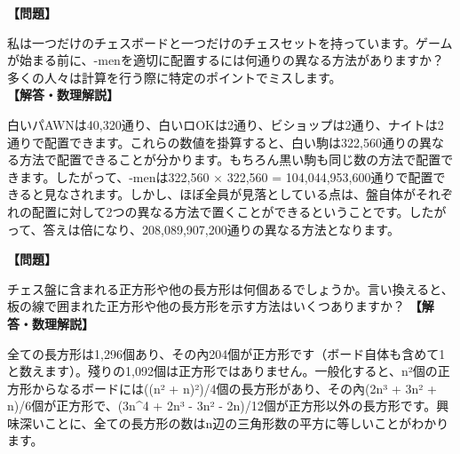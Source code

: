 \documentclass[10pt,a4paper,oneside,openany]{ltjsbook}
\begin{document}
\begin{tcolorbox}[colback=softblue,colframe=primaryblue,title=\textbf{第 346 問：盤を整える方法 （原題: SETTING THE BOARD.）},arc=2mm,boxrule=1pt,breakable]
\textbf{【問題】}\par\vspace{0.3em}
私は一つだけのチェスボードと一つだけのチェスセットを持っています。ゲームが始まる前に、-menを適切に配置するには何通りの異なる方法がありますか？多くの人々は計算を行う際に特定のポイントでミスします。
\tcblower
\textbf{【解答・数理解説】}\par\vspace{0.3em}
白いパAWNは40,320通り、白いロOKは2通り、ビショップは2通り、ナイトは2通りで配置できます。これらの数値を掛算すると、白い駒は322,560通りの異なる方法で配置できることが分かります。もちろん黒い駒も同じ数の方法で配置できます。したがって、-menは322,560 × 322,560 = 104,044,953,600通りで配置できると見なされます。しかし、ほぼ全員が見落としている点は、盤自体がそれぞれの配置に対して2つの異なる方法で置くことができるということです。したがって、答えは倍になり、208,089,907,200通りの異なる方法となります。
\end{tcolorbox}

\begin{tcolorbox}[colback=softblue,colframe=primaryblue,title=\textbf{第 347 問：長方形の数を数える （原題: COUNTING THE RECTANGLES.）},arc=2mm,boxrule=1pt,breakable]
\textbf{【問題】}\par\vspace{0.3em}
チェス盤に含まれる正方形や他の長方形は何個あるでしょうか。言い換えると、板の線で囲まれた正方形や他の長方形を示す方法はいくつありますか？
\tcblower
\textbf{【解答・数理解説】}\par\vspace{0.3em}
全ての長方形は1,296個あり、その內204個が正方形です（ボード自体も含めて1と数えます）。殘りの1,092個は正方形ではありません。一般化すると、n²個の正方形からなるボードには((n² + n)²)/4個の長方形があり、その內(2n³ + 3n² + n)/6個が正方形で、(3n\textasciicircum{}4 + 2n³ - 3n² - 2n)/12個が正方形以外の長方形です。興味深いことに、全ての長方形の数はn辺の三角形数の平方に等しいことがわかります。
\end{tcolorbox}
\end{document}
